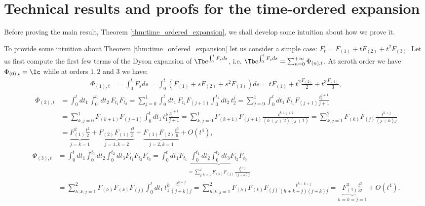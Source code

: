 \section{Technical results and proofs for the time-ordered expansion}
\label{sec:thechnical_results:time_ordered}
Before proving the main result, Theorem \ref{thm:time_ordered_expansion}, we shall develop some intuition about how we prove it.
\begin{example}
To provide some intuition about Theorem \ref{thm:time_ordered_expansion} let us consider a simple case: \(F_t = F_{(1)} + t F_{(2)} +t^2 F_{(3)}\). 
Let us first compute the first few terms of the Dyson expansion \cite{Dyson} of $\Tb e^{\int_0^t F_s ds}$, i.e. $\Tb e^{\int_0^t F_s ds} = \sum_{n=0}^{+\infty} \Phi_{(n),t}$.
At zeroth order we have $\Phi_{(0),t} = \Ic$ while at orders $1,2$ and $3$ we have:
\begin{align*}
    \Phi_{(1),t} &= \int_0^t F_{s} ds = \int_0^t (F_{(1)} + sF_{(2)} + s^{2} F_{(3)}) ds = 
    t F_{(1)} + t^2\frac{F_{(2)}}{2} + t^3 \frac{F_{(3)}}{3} ,
\end{align*}
\begin{align*}
    \Phi_{(2),t} &= \int_0^t dt_1\, \int_0^{t_1} dt_2\, F_{t_1} F_{t_2} 
    = \sum_{j=0}^{1} \int_0^t dt_1\, F_{t_1} F_{(j+1)} \int_0^{t_1} dt_2\,  t_2^j 
    = \sum_{j=0}^{1} \int_0^t dt_1\, F_{t_1}F_{(j+1)}  \frac{t_1^{j+1}}{j+1}\\
    & = \sum_{k,j=0}^{1} F_{(k+1)}F_{(j+1)} \int_0^t dt_1\, t_1^k \frac{t_1^{j+1}}{j+1} = \sum_{k,j=0}^{1} F_{(k+1)}F_{(j+1)} \frac{t^{k+j+2}}{(k+j+2)(j+1)} = \sum_{k,j=1}^{2} F_{(k)}F_{(j)} \frac{t^{k+j}}{(j+k)j}\\
    &= \underbrace{F_{(1)}^2 \frac{t^2}{2}}_{j=k=1}
    + \underbrace{F_{(2)}F_{(1)}\frac{t^3}{3}}_{j=1,k=2} 
    + \underbrace{F_{(1)}F_{(2)}\frac{t^3}{6}}_{j=2,k=1} 
    + O(t^4),
\end{align*}
\begin{align*}
    \Phi_{(3),t} &= \int_0^t dt_1 \int_0^{t_1} dt_2 \int_0^{t_2} dt_3 F_{t_1} F_{t_2} F_{t_3} = \int_0^t dt_1 F_{t_1} \underbrace{\int_0^{t_1} dt_2 \int_0^{t_2} dt_3  F_{t_2} F_{t_3}}_{= \sum_{j,k=1}^{2} F_{(k)}F_{(j)} \frac{t_1^{k+j}}{(j+k)j}}\\ 
    &= \sum_{h,k,j=1}^{2} F_{(h)}F_{(k)}F_{(j)} \int_0^t dt_1\, t_1^h \frac{t_1^{k+j}}{(j+k)j} = \sum_{h,k,j=1}^{2} F_{(h)}F_{(k)}F_{(j)}  \frac{t^{h+k+j}}{(h+k+j)(j+k)j} 
     = \underbrace{F_{(1)}^3 \frac{t^{3}}{3!}}_{h=k=j=1} + O(t^4).
\end{align*}

\end{example}
